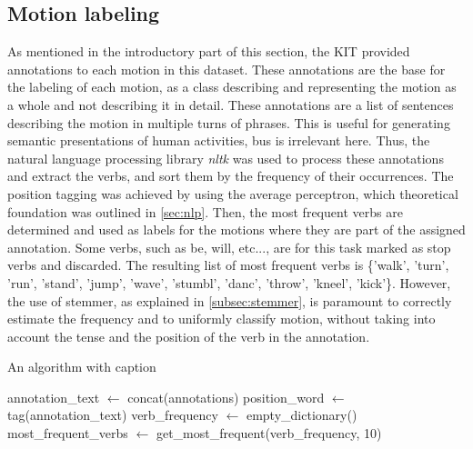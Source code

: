		\subsection{Motion labeling}
			As mentioned in the introductory part of this section, the KIT provided annotations to each motion in this dataset. These annotations are the base for the labeling of each motion, as a class describing and representing the motion as a whole and not describing it in detail. These annotations are a list of sentences describing the motion in multiple turns of phrases. This is useful for generating semantic presentations of human activities, bus is irrelevant here. Thus, the natural language processing library \textit{nltk} was used to process these annotations and extract the verbs, and sort them by the frequency of their occurrences.\newline
			The position tagging was achieved by using the average perceptron, which theoretical foundation was outlined in \ref{sec:nlp}. Then, the most frequent verbs are determined and used as labels for the motions where they are part of the assigned annotation. Some verbs, such as be, will, etc..., are for this task marked as stop verbs and discarded. The resulting list of most frequent verbs is \{'walk', 'turn', 'run', 'stand', 'jump', 'wave', 'stumbl', 'danc', 'throw', 'kneel', 'kick'\}. However, the use of stemmer, as explained in \ref{subsec:stemmer}, is paramount to correctly estimate the frequency and to uniformly classify motion, without taking into account the tense and the position of the verb in the annotation.\newline
			\begin{algorithm}[H]
				\caption{An algorithm with caption}\label{alg:motionlabeling}
				annotation\_text $\gets$ concat(annotations)\;
				position\_word $\gets$ tag(annotation\_text)\; 
				verb\_frequency $\gets$ empty\_dictionary()\;
				most\_frequent\_verbs $\gets$ get\_most\_frequent(verb\_frequency, 10)\;
			\end{algorithm}
